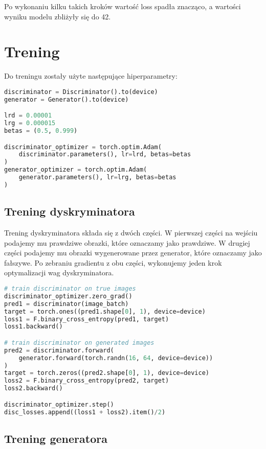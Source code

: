 \documentclass[a4paper]{article}
\begin{document}
Po wykonaniu kilku takich kroków wartość loss spadła znacząco, a wartości wyniku
modelu zbliżyły się do 42.

\section{Trening}
Do treningu zostały użyte następujące hiperparametry:
\begin{lstlisting}[language=python,caption={Parametry treningu}]
discriminator = Discriminator().to(device)
generator = Generator().to(device)

lrd = 0.00001
lrg = 0.000015
betas = (0.5, 0.999)

discriminator_optimizer = torch.optim.Adam(
    discriminator.parameters(), lr=lrd, betas=betas
)
generator_optimizer = torch.optim.Adam(
    generator.parameters(), lr=lrg, betas=betas
)
\end{lstlisting}

\subsection{Trening dyskryminatora}

Trening dyskryminatora składa się z dwóch części. W pierwszej części na wejściu
podajemy mu prawdziwe obrazki, które oznaczamy jako prawdziwe. W drugiej części
podajemy mu obrazki wygenerowane przez generator, które oznaczamy jako fałszywe.
Po zebraniu gradientu z obu części, wykonujemy jeden krok optymalizacji wag dyskryminatora.


\begin{lstlisting}[language=python]
# train discriminator on true images
discriminator_optimizer.zero_grad()
pred1 = discriminator(image_batch)
target = torch.ones((pred1.shape[0], 1), device=device)
loss1 = F.binary_cross_entropy(pred1, target)
loss1.backward()

# train discriminator on generated images
pred2 = discriminator.forward(
    generator.forward(torch.randn(16, 64, device=device))
)
target = torch.zeros((pred2.shape[0], 1), device=device)
loss2 = F.binary_cross_entropy(pred2, target)
loss2.backward()

discriminator_optimizer.step()
disc_losses.append((loss1 + loss2).item()/2)
\end{lstlisting}

\subsection{Trening generatora}
\end{document}
